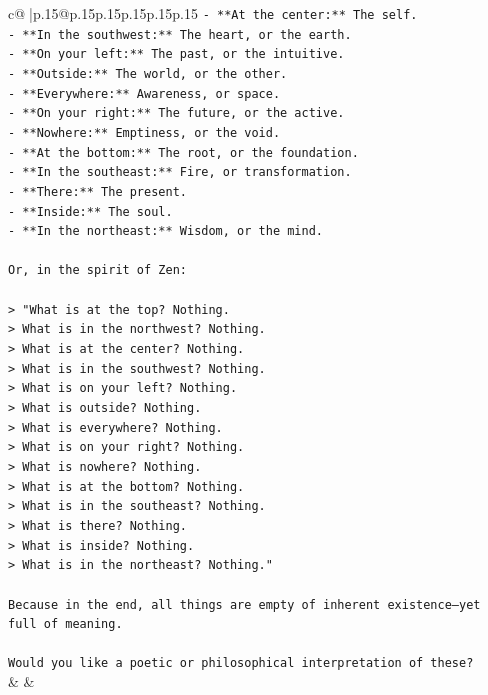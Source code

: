 \documentclass{article}
\begin{document}
{\begin{supertabular}{c@{$\;$}|p{.15\linewidth}@{}p{.15\linewidth}p{.15\linewidth}p{.15\linewidth}p{.15\linewidth}p{.15\linewidth}}
{{{\texttt{{-} **At the center:** The self.} \\
\texttt{{-} **In the southwest:** The heart, or the earth.} \\
\texttt{{-} **On your left:** The past, or the intuitive.} \\
\texttt{{-} **Outside:** The world, or the other.} \\
\texttt{{-} **Everywhere:** Awareness, or space.} \\
\texttt{{-} **On your right:** The future, or the active.} \\
\texttt{{-} **Nowhere:** Emptiness, or the void.} \\
\texttt{{-} **At the bottom:** The root, or the foundation.} \\
\texttt{{-} **In the southeast:** Fire, or transformation.} \\
\texttt{{-} **There:** The present.} \\
\texttt{{-} **Inside:** The soul.} \\
\texttt{{-} **In the northeast:** Wisdom, or the mind.} \\
\\ 
\texttt{Or, in the spirit of Zen:} \\
\\ 
\texttt{> "What is at the top? Nothing.  } \\
\texttt{> What is in the northwest? Nothing.  } \\
\texttt{> What is at the center? Nothing.  } \\
\texttt{> What is in the southwest? Nothing.  } \\
\texttt{> What is on your left? Nothing.  } \\
\texttt{> What is outside? Nothing.  } \\
\texttt{> What is everywhere? Nothing.  } \\
\texttt{> What is on your right? Nothing.  } \\
\texttt{> What is nowhere? Nothing.  } \\
\texttt{> What is at the bottom? Nothing.  } \\
\texttt{> What is in the southeast? Nothing.  } \\
\texttt{> What is there? Nothing.  } \\
\texttt{> What is inside? Nothing.  } \\
\texttt{> What is in the northeast? Nothing."} \\
\\ 
\texttt{Because in the end, all things are empty of inherent existence—yet full of meaning.} \\
\\ 
\texttt{Would you like a poetic or philosophical interpretation of these?} \\
            }
        }
    }
    & & \\ \\


\end{supertabular}}
\end{document}
